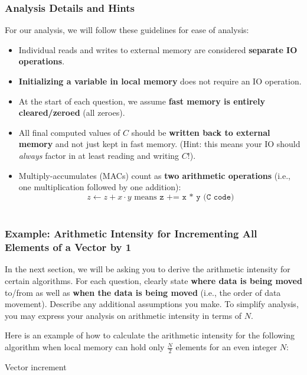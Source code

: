 \documentclass[a4 paper]{article}
\begin{document}
\subsubsection*{Analysis Details and Hints}

For our analysis, we will follow these guidelines for ease of analysis: 
\begin{itemize}
\item Individual reads and writes to external memory are considered \textbf{separate IO operations}.
\item \textbf{Initializing a variable in local memory} does not require an IO operation.
\item At the start of each question, we assume \textbf{fast memory is entirely cleared/zeroed} (all zeroes).
\item All final computed values of $C$ should be \textbf{written back to external memory} and not just kept in fast memory. (Hint: this means your IO should \textit{always} factor in at least reading and writing $C$!). 
\item Multiply-accumulates (MACs) count as \textbf{two arithmetic operations} (i.e., one multiplication followed by one addition):
\[
 z \leftarrow z + x \cdot y \text{ means } \texttt{z += x * y (C code)}
\]
\
\end{itemize}



\subsubsection*{Example: Arithmetic Intensity for Incrementing All Elements of a Vector by 1}
In the next section, we will be asking you to derive the arithmetic intensity for certain algorithms.
For each question, clearly state \textbf{where data is being moved} to/from as well as \textbf{when the data is being moved} (i.e., the order of data movement).
Describe any additional assumptions you make.
To simplify analysis, you may express your analysis on arithmetic intensity in terms of $N$.

Here is an example of how to calculate the arithmetic intensity for the following algorithm when local memory can hold only $\frac{N}{2}$ elements for an even integer $N$:\\
\begin{algorithm}[H]
\SetAlgoLined
\SetInd{0.25em}{0.5em}
\caption{Vector increment}
\label{algo:vector_increment}
\end{algorithm}
\end{document}

